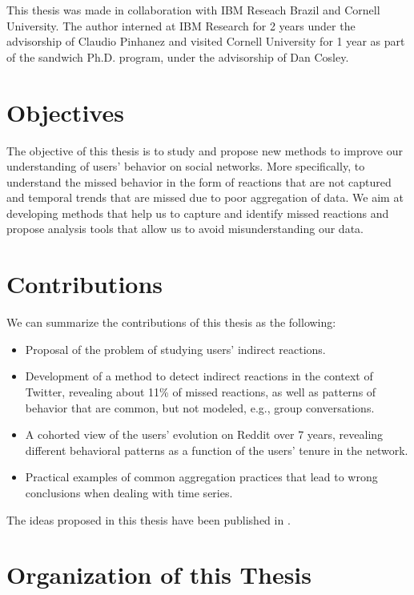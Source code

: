 This thesis was made in collaboration with IBM Reseach Brazil and Cornell University. The author interned at IBM Research for 2 years under the advisorship of Claudio Pinhanez and visited Cornell University for 1 year as part of the sandwich Ph.D. program, under the advisorship of Dan Cosley.

\section{Objectives}

The objective of this thesis is to study and propose new methods to improve our understanding of users' behavior on social networks. More specifically, to understand the missed behavior in the form of reactions that are not captured and temporal trends that are missed due to poor aggregation of data. We aim at developing methods that help us to capture and identify missed reactions and propose analysis tools that allow us to avoid misunderstanding our data.

\section{Contributions}

We can summarize the contributions of this thesis as the following:

\begin{itemize}
	\item Proposal of the problem of studying users' indirect reactions.
	\item Development of a method to detect indirect reactions in the context of Twitter, revealing about 11\% of missed reactions, as well as patterns of behavior that are common, but not modeled, e.g., group conversations.
	\item A cohorted view of the users' evolution on Reddit over 7 years, revealing different behavioral patterns as a function of the users' tenure in the network.
	\item Practical examples of common aggregation practices that lead to wrong conclusions when dealing with time series.
\end{itemize}

The ideas proposed in this thesis have been published in \cite{BarbosaNeto2013, Barbosa, Barbosa2016}.

\section{Organization of this Thesis}

